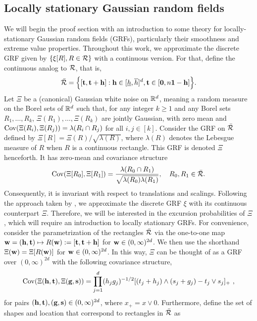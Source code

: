 \documentclass[twoside,11pt]{article}
\begin{document}
\subsection{Locally stationary Gaussian random fields}
\label{sec:local_stationary}
We will begin the proof section with an introduction to some theory for locally-stationary Gaussian random fields (GRFs), particularly their smoothness and extreme value properties.
Throughout this work, we approximate the discrete GRF given by $\{\xi[R], R \in \mathcal{R}\}$ with a continuous version.  
For that, define the continuous analog to $\mathcal{R}$, that is, 
\[
\bar {\mathcal{R}} = \Big\{ [\mathbf{t}, \mathbf{t}+\mathbf{h}] : \mathbf{h} \in [\underline h,\overline h]^d, \mathbf{t} \in [{\bf 0}, n {\bf 1} - \mathbf{h}] \Big\}.
\]
Let $\Xi$ be a (canonical) Gaussian white noise on $\mathbb{R}^d$, meaning a random measure on the Borel sets of $\mathbb{R}^d$ such that, for any integer $k \ge 1$ and any Borel sets $R_1, \dots, R_k$, $\Xi(R_1), \dots, \Xi(R_k)$ are jointly Gaussian, with zero mean and $\operatorname*{Cov}(\Xi(R_i), \Xi(R_j)) = \lambda(R_i \cap R_j)$ for all $i,j \in [k]$.
Consider the GRF on $\bar {\mathcal{R}}$ defined by $\Xi[R] = \Xi(R)/\sqrt{\lambda(R)}$, where $\lambda(R)$ denotes the Lebesgue measure of $R$ when $R$ is a continuous rectangle.
This GRF is denoted $\Xi$ henceforth.  It has zero-mean and covariance structure
\[\operatorname*{Cov} (\Xi[R_0], \Xi[R_1]) = \frac{\lambda(R_0 \cap R_1)}{\sqrt{\lambda(R_0)\lambda(R_1)}}, \quad R_0, R_1 \in \bar {\mathcal{R}}.
\]
Consequently, it is invariant with respect to translations and scalings. 
Following the approach taken by \cite{kabluchko2011extremes}, we approximate the discrete GRF $\xi$ with its continuous counterpart $\Xi$.  
Therefore, we will be interested in the excursion probabilities of $\Xi$, which will require an introduction to locally stationary GRFs.
For convenience, consider the parametrization of the rectangles $\bar {\mathcal{R}}$ via the one-to-one map $\mathbf{w} = (\mathbf{h},\mathbf{t}) \mapsto R(\mathbf{w}) := [\mathbf{t}, \mathbf{t}+\mathbf{h}]$ for $\mathbf{w} \in (0,\infty)^{2d}$.
We then use the shorthand $\Xi(\mathbf{w}) = \Xi[R(\mathbf{w})]$ for $\mathbf{w} \in (0,\infty)^{2d}$.
In this way, $\Xi$ can be thought of as a GRF over $(0,\infty)^{2d}$  with the following covariance structure,
\begin{equation}
\label{eq:Xi_covariance}
\operatorname*{Cov}(\Xi(\mathbf{h},\mathbf{t}),\Xi(\mathbf{g},\mathbf{s})) = \prod_{j=1}^d (h_jg_j)^{-1/2} [(t_j + h_j) \wedge (s_j + g_j) - t_j \vee s_j]_+~,   
\end{equation}
for pairs $(\mathbf{h}, \mathbf{t}), (\mathbf{g}, \mathbf{s}) \in (0,\infty)^{2d}$, where $x_+ = x \vee 0$.
Furthermore, define the set of shapes and location that correspond to rectangles in $\bar {\mathcal{R}}$ as
\end{document}
